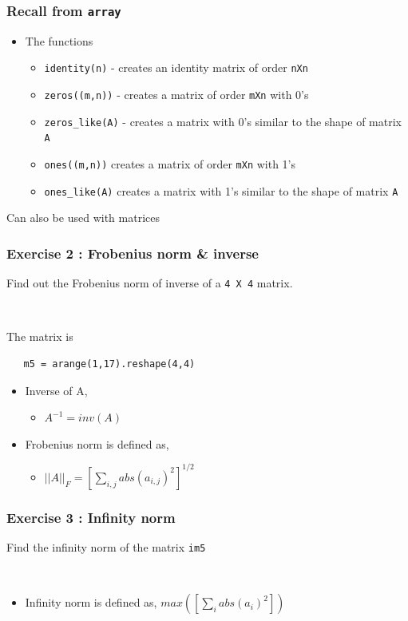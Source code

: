 \documentclass[presentation]{beamer}
\begin{document}
\begin{frame}
\frametitle{Recall from \verb~array~}
\label{sec-7}


\begin{itemize}
\item The functions
\begin{itemize}
\item \verb~identity(n)~ - 
      creates an identity matrix of order \verb~nXn~
\item \verb~zeros((m,n))~ - 
      creates a matrix of order \verb~mXn~ with 0's
\item \verb~zeros_like(A)~ - 
      creates a matrix with 0's similar to the shape of matrix \verb~A~
\item \verb~ones((m,n))~
      creates a matrix of order \verb~mXn~ with 1's
\item \verb~ones_like(A)~
      creates a matrix with 1's similar to the shape of matrix \verb~A~
\end{itemize}
\end{itemize}
  Can also be used with matrices
\end{frame}
\begin{frame}[fragile]
\frametitle{Exercise 2 : Frobenius norm \& inverse}
\label{sec-8}

   Find out the Frobenius norm of inverse of a \verb~4 X 4~ matrix.
\begin{verbatim}
   
\end{verbatim}

  The matrix is
\begin{verbatim}
   m5 = arange(1,17).reshape(4,4)
\end{verbatim}


\begin{itemize}
\item Inverse of A,
\begin{itemize}
\item $A^{-1} = inv(A)$
\end{itemize}
\item Frobenius norm is defined as,
\begin{itemize}
\item $||A||_F = [\sum_{i,j} abs(a_{i,j})^2]^{1/2}$
\end{itemize}
\end{itemize}
\end{frame}
\begin{frame}[fragile]
\frametitle{Exercise 3 : Infinity norm}
\label{sec-9}

  Find the infinity norm of the matrix \verb~im5~
\begin{verbatim}
   
\end{verbatim}


\begin{itemize}
\item Infinity norm is defined as,
       $max([\sum_{i} abs(a_{i})^2])$
\end{itemize}
\end{frame}
\end{document}
